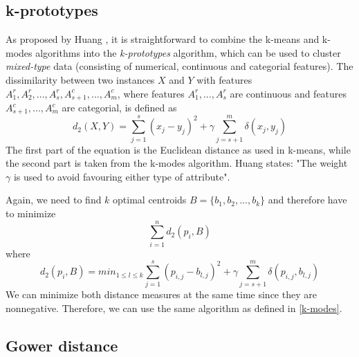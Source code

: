 \subsection{k-prototypes}

As proposed by Huang \cite{kmodes}, it is straightforward to combine the k-means and k-modes algorithms into the \textit{k-prototypes} algorithm, which can be used to cluster \textit{mixed-type} data (consisting of numerical, continuous and categorial features). The dissimilarity between two instances $X$ and $Y$ with features $A^r_1, A^r_2, ..., A^r_s, A_{s+1}^c, ..., A^c_m$, where features $A^r_1, ..., A^r_s$ are continuous and features $A_{s+1}^c, ..., A^c_m$ are categorial, is defined as
$$d_2(X,Y) = \sum^s_{j=1}(x_j - y_j)^2 + \gamma \sum^m_{j=s+1}\delta(x_j, y_j)$$
The first part of the equation is the Euclidean distance as used in k-means, while the second part is taken from the k-modes algorithm. Huang \cite{kmodes} states: "The weight $\gamma$ is used to avoid favouring either type of attribute".

Again, we need to find $k$ optimal centroids $B=\{b_1, b_2, ..., b_k\}$ and therefore have to minimize
$$\sum_{i=1}^n  d_2(p_i, B)$$
where
$$d_2(p_i, B) = min_{1 \leq l \leq k} \sum^s_{j=1}(p_{i,j} - b_{l,j})^2 + \gamma \sum^m_{j=s+1}\delta(p_{i,j}, b_{l,j})$$
We can minimize both distance measures at the same time since they are nonnegative. Therefore, we can use the same algorithm as defined in \ref{k-modes}. \cite{kmodes}

\subsection{Gower distance}

